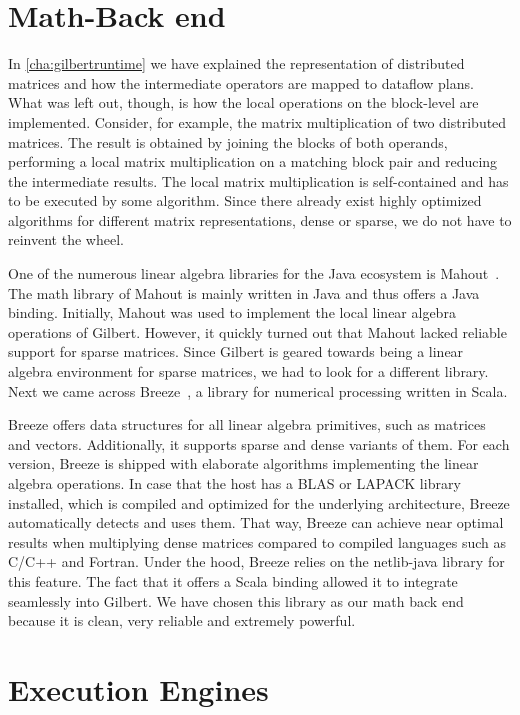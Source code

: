 \section{Math-Back end}

In \cref{cha:gilbertruntime} we have explained the representation of distributed matrices and how the intermediate operators are mapped to dataflow plans.
What was left out, though, is how the local operations on the block-level are implemented.
Consider, for example, the matrix multiplication of two distributed matrices.
The result is obtained by joining the blocks of both operands, performing a local matrix multiplication on a matching block pair and reducing the intermediate results.
The local matrix multiplication is self-contained and has to be executed by some algorithm.
Since there already exist highly optimized algorithms for different matrix representations, dense or sparse, we do not have to reinvent the wheel.

One of the numerous linear algebra libraries for the Java ecosystem is Mahout~\cite{mahout:2011a}.
The math library of Mahout is mainly written in Java and thus offers a Java binding.
Initially, Mahout was used to implement the local linear algebra operations of Gilbert.
However, it quickly turned out that Mahout lacked reliable support for sparse matrices.
Since Gilbert is geared towards being a linear algebra environment for sparse matrices, we had to look for a different library.
Next we came across Breeze~\cite{breeze}, a library for numerical processing written in Scala.

Breeze offers data structures for all linear algebra primitives, such as matrices and vectors.
Additionally, it supports sparse and dense variants of them.
For each version, Breeze is shipped with elaborate algorithms implementing the linear algebra operations.
In case that the host has a BLAS or LAPACK library installed, which is compiled and optimized for the underlying architecture, Breeze automatically detects and uses them.
That way, Breeze can achieve near optimal results when multiplying dense matrices compared to compiled languages such as C/C++ and Fortran.
Under the hood, Breeze relies on the netlib-java library for this feature.
The fact that it offers a Scala binding allowed it to integrate seamlessly into Gilbert.
We have chosen this library as our math back end because it is clean, very reliable and extremely powerful.

\section{Execution Engines}

